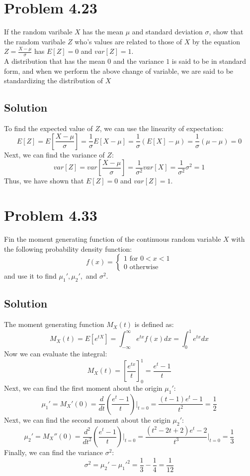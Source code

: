 \documentclass{article}
\begin{document}
\section*{Problem 4.23}
If the random varibale $X$ has the mean $\mu$ and standard deviation $\sigma$, show that the random varibale $Z$ who's values are related to those of $X$ by the equation $Z = \frac{X - \mu}{\sigma}$ has $E[Z] = 0 $ and $var[Z] = 1$.\\  
A distribution that has the mean $0$ and the variance $1$ is said to be in standard form, and when we perform the above change of variable, we are said to be standardizing the distribution of $X$
\subsection*{Solution}
To find the expected value of $Z$, we can use the linearity of expectation:
$$
E[Z] = E\left[\frac{X - \mu}{\sigma}\right] = \frac{1}{\sigma} E[X - \mu] = \frac{1}{\sigma} (E[X] - \mu) = \frac{1}{\sigma} (\mu - \mu) = 0
$$
Next, we can find the variance of $Z$:
$$
var[Z] = var\left[\frac{X - \mu}{\sigma}\right] = \frac{1}{\sigma^2} var[X] = \frac{1}{\sigma^2} \sigma^2 = 1
$$
Thus, we have shown that $E[Z] = 0$ and $var[Z] = 1$.
\section*{Problem 4.33}
Fin the moment generating function of the continuous random variable $X$ with the following probability density function:
$$ f(x) = \begin{cases}
    1 \text{ for } 0 < x < 1 \\
    0 \text{ otherwise}
\end{cases} $$
and use it to find $\mu_1', \mu_2',$ and $\sigma^2$.
\subsection*{Solution}
The moment generating function $M_X(t)$ is defined as:
$$
M_X(t) = E[e^{tX}] = \int_{-\infty}^{\infty} e^{tx} f(x) dx = \int_{0}^{1} e^{tx} dx
$$
Now we can evaluate the integral:
$$
M_X(t) = \left[ \frac{e^{tx}}{t} \right]_{0}^{1} = \frac{e^{t} - 1}{t}
$$
Next, we can find the first moment about the origin $\mu_1'$:
$$
\mu_1' = M_X'(0) = \frac{d}{dt} \left( \frac{e^{t} - 1}{t} \right) \bigg|_{t=0} = \frac{(t-1)e^t - 1}{t^2} = \frac{1}{2}
$$
Next, we can find the second moment about the origin $\mu_2'$:
$$
\mu_2' = M_X''(0) = \frac{d^2}{dt^2} \left( \frac{e^{t} - 1}{t} \right) \bigg|_{t=0} = \frac{(t^2-2t+2)e^t - 2}{t^3} \bigg|_{t=0} = \frac{1}{3}
$$
Finally, we can find the variance $\sigma^2$:
$$
\sigma^2 = \mu_2' - \mu_1'^2 = \frac{1}{3} - \frac{1}{4} = \frac{1}{12}
$$
\end{document}
